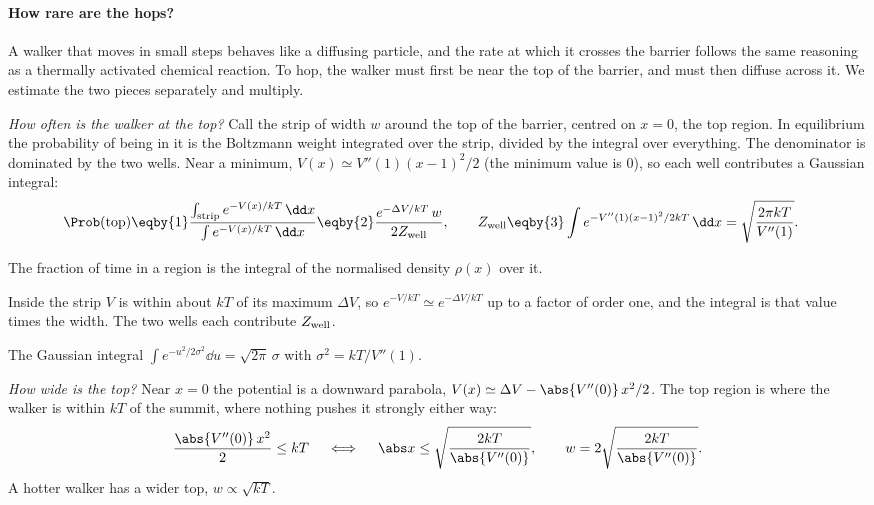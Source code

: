 \paragraph{How rare are the hops?}
A walker that moves in small steps behaves like a diffusing particle, and the rate at which it
crosses the barrier follows the same reasoning as a thermally activated chemical reaction. To
hop, the walker must first be near the top of the barrier, and must then diffuse across it. We
estimate the two pieces separately and multiply.

\emph{How often is the walker at the top?} Call the strip of width $w$ around the top of the
barrier, centred on $x=0$, the top region. In equilibrium the probability of being in it is the
Boltzmann weight integrated over the strip, divided by the integral over everything. The
denominator is dominated by the two wells. Near a minimum, $V(x)\simeq V''(1)(x-1)^2/2$ (the
minimum value is 0), so each well contributes a Gaussian integral:
\begin{align*}
  \Prob(\text{top})
  &\eqby{1}\frac{\int_{\rm strip}e^{-V(x)/kT}\,\dd x}{\int e^{-V(x)/kT}\,\dd x}
   \eqby{2}\frac{e^{-\Delta V/kT}\,w}{2Z_{\rm well}},
  \qquad
  Z_{\rm well}\eqby{3}\int e^{-V''(1)(x-1)^2/2kT}\,\dd x=\sqrt{\frac{2\pi kT}{V''(1)}} .
\end{align*}
\begin{explain}
  \item The fraction of time in a region is the integral of the normalised density $\rho(x)$
        over it.
  \item Inside the strip $V$ is within about $kT$ of its maximum $\Delta V$, so
        $e^{-V/kT}\simeq e^{-\Delta V/kT}$ up to a factor of order one, and the integral is that
        value times the width. The two wells each contribute $Z_{\rm well}$.
  \item The Gaussian integral $\int e^{-u^2/2\sigma^2}\dd u=\sqrt{2\pi}\,\sigma$ with
        $\sigma^2=kT/V''(1)$.
\end{explain}

\emph{How wide is the top?} Near $x=0$ the potential is a downward parabola,
$V(x)\simeq\Delta V-\abs{V''(0)}\,x^2/2$. The top region is where the walker is within $kT$ of the
summit, where nothing pushes it strongly either way:
\begin{equation*}
  \frac{\abs{V''(0)}\,x^2}{2}\le kT
  \quad\iff\quad
  \abs x\le\sqrt{\frac{2kT}{\abs{V''(0)}}},
  \qquad
  w=2\sqrt{\frac{2kT}{\abs{V''(0)}}} .
\end{equation*}
A hotter walker has a wider top, $w\propto\sqrt{kT}$.

